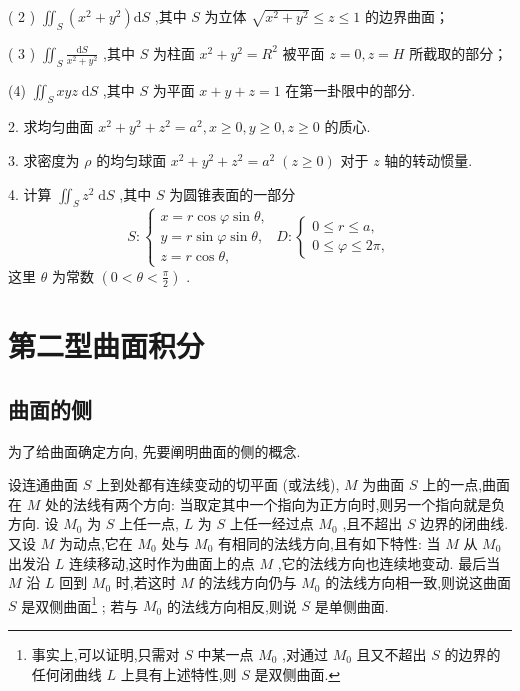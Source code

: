 ( 2 ) \({\iint }_{S}\left( {{x}^{2} + {y}^{2}}\right) \mathrm{d}S\) ,其中 \(S\) 为立体 \(\sqrt{{x}^{2} + {y}^{2}} \leq  z \leq  1\) 的边界曲面；

( 3 ) \({\iint }_{S}\frac{\mathrm{d}S}{{x}^{2} + {y}^{2}}\) ,其中 \(S\) 为柱面 \({x}^{2} + {y}^{2} = {R}^{2}\) 被平面 \(z = 0,z = H\) 所截取的部分；

(4) \({\iint }_{S}{xyz}\mathrm{\;d}S\) ,其中 \(S\) 为平面 \(x + y + z = 1\) 在第一卦限中的部分.

2. 求均匀曲面 \({x}^{2} + {y}^{2} + {z}^{2} = {a}^{2},x \geq  0,y \geq  0,z \geq  0\) 的质心.

3. 求密度为 \(\rho\) 的均匀球面 \({x}^{2} + {y}^{2} + {z}^{2} = {a}^{2}\;\left( {z \geq  0}\right)\) 对于 \(z\) 轴的转动惯量.

4. 计算 \({\iint }_{S}{z}^{2}\mathrm{\;d}S\) ,其中 \(S\) 为圆锥表面的一部分
\[
S : \left\{  {\begin{array}{l} x = r\cos \varphi \sin \theta , \\  y = r\sin \varphi \sin \theta , \\  z = r\cos \theta , \end{array}\;D : \left\{  \begin{array}{l} 0 \leq  r \leq  a, \\  0 \leq  \varphi  \leq  {2\pi }, \end{array}\right. }\right.
\]
这里 \(\theta\) 为常数 \(\left( {0 < \theta  < \frac{\pi }{2}}\right)\) .

\section{第二型曲面积分}

\subsection{曲面的侧}

为了给曲面确定方向, 先要阐明曲面的侧的概念.

设连通曲面 \(S\) 上到处都有连续变动的切平面 (或法线), \(M\) 为曲面 \(S\) 上的一点,曲面在 \(M\) 处的法线有两个方向: 当取定其中一个指向为正方向时,则另一个指向就是负方向. 设 \({M}_{0}\) 为 \(S\) 上任一点, \(L\) 为 \(S\) 上任一经过点 \({M}_{0}\) ,且不超出 \(S\) 边界的闭曲线. 又设 \(M\) 为动点,它在 \({M}_{0}\) 处与 \({M}_{0}\) 有相同的法线方向,且有如下特性: 当 \(M\) 从 \({M}_{0}\) 出发沿 \(L\) 连续移动,这时作为曲面上的点 \(M\) ,它的法线方向也连续地变动. 最后当 \(M\) 沿 \(L\) 回到 \({M}_{0}\) 时,若这时 \(M\) 的法线方向仍与 \({M}_{0}\) 的法线方向相一致,则说这曲面 \(S\) 是双侧曲面\footnote{事实上,可以证明,只需对 \(S\) 中某一点 \({M}_{0}\) ,对通过 \({M}_{0}\) 且又不超出 \(S\) 的边界的任何闭曲线 \(L\) 上具有上述特性,则 \(S\) 是双侧曲面.} ; 若与 \({M}_{0}\) 的法线方向相反,则说 \(S\) 是单侧曲面.

